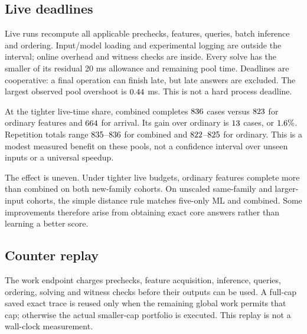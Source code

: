 \documentclass[10pt,english]{article}
\begin{document}
\subsection{Live deadlines}
Live runs recompute all applicable prechecks, features, queries, batch inference and ordering. Input/model loading and experimental logging are outside the interval; online overhead and witness checks are inside. Every solve has the smaller of its residual 20 ms allowance and remaining pool time. Deadlines are cooperative: a final operation can finish late, but late answers are excluded. The largest observed pool overshoot is \(0.44\) ms. This is not a hard process deadline.

\begin{table}[htbp]
\centering\footnotesize

\caption{Median total exact completions among \(\SixCases\) encoded cases. Sum completions across the eight separately budgeted cohorts within a repetition, then take the median of three totals. Short is shortest input, Rule is the nonlearned structural score. Work and live time are separate endpoints.}
\end{table}

At the tighter live-time share, combined completes \(836\) cases versus \(823\) for ordinary features and \(664\) for arrival. Its gain over ordinary is \(13\) cases, or \(1.6\%\). Repetition totals range \(835\)--\(836\) for combined and \(822\)--\(825\) for ordinary. This is a modest measured benefit on these pools, not a confidence interval over unseen inputs or a universal speedup.

The effect is uneven. Under tighter live budgets, ordinary features complete more than combined on both new-family cohorts. On unscaled same-family and larger-input cohorts, the simple distance rule matches five-only ML and combined. Some improvements therefore arise from obtaining exact core answers rather than learning a better score.

\subsection{Counter replay}
The work endpoint charges prechecks, feature acquisition, inference, queries, ordering, solving and witness checks before their outputs can be used. A full-cap saved exact trace is reused only when the remaining global work permits that cap; otherwise the actual smaller-cap portfolio is executed. This replay is not a wall-clock measurement.
\end{document}
